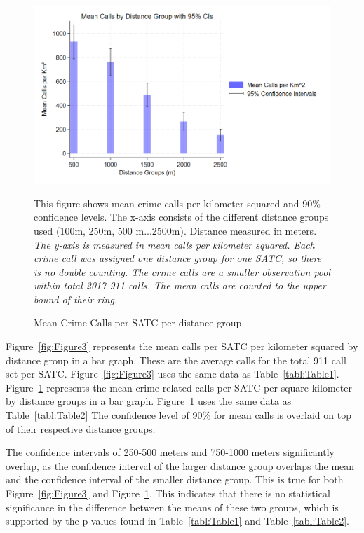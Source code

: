 \documentclass[12pt]{article}
\begin{document}
\begin{figure}[htbp]
    \centering
\includegraphics[width=0.75\linewidth]{Reproducibility Package/Downloaded_calls/Visual_Graphics_Downloaded_calls/500_CI_Graph.png}
    \caption{Mean Crime Calls per SATC per distance group}
    \label{fig:Figure4}
       {This figure shows mean crime calls per kilometer squared and 90\% confidence levels. The x-axis consists of the different distance groups used (100m, 250m, 500 m...2500m). Distance measured in meters.}
    \textit{The y-axis is measured in mean calls per kilometer squared. Each crime call was assigned one distance group for one SATC, so there is no double counting. The crime calls are a smaller observation pool within total 2017 911 calls. The mean calls are counted to the upper bound of their ring.}
\end{figure}

Figure~\ref{fig:Figure3} represents the mean calls per SATC per kilometer squared by distance group in a bar graph. These are the average calls for the total 911 call set per SATC. Figure~\ref{fig:Figure3} uses the same data as Table~\ref{tabl:Table1}. Figure~\ref{fig:Figure4} represents the mean crime-related calls per SATC per square kilometer by distance groups in a bar graph. Figure~\ref{fig:Figure4} uses the same data as Table~\ref{tabl:Table2} The confidence level of 90\% for mean calls is overlaid on top of their respective distance groups. 

The confidence intervals of 250-500 meters and 750-1000 meters significantly overlap, as the confidence interval of the larger distance group overlaps the mean and the confidence interval of the smaller distance group. This is true for both Figure~\ref{fig:Figure3} and Figure~\ref{fig:Figure4}. This indicates that there is no statistical significance in the difference between the means of these two groups, which is supported by the p-values found in Table~\ref{tabl:Table1} and Table~\ref{tabl:Table2}. 
\end{document}
